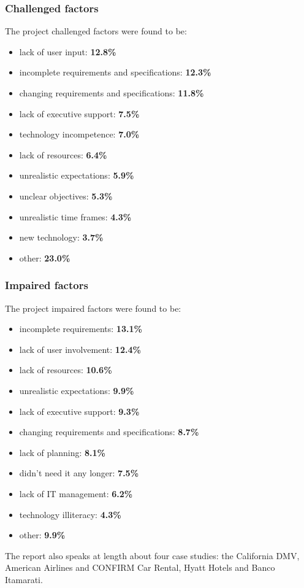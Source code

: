\documentclass[journal]{IEEEtran}
\begin{document}
\subsubsection{Challenged factors}
The project challenged factors were found to be:
\begin{itemize}
	\item lack of user input: \textbf{12.8\%}
	\item incomplete requirements and specifications: \textbf{12.3\%}
	\item changing requirements and specifications: \textbf{11.8\%}
	\item lack of executive support: \textbf{7.5\%}
	\item technology incompetence: \textbf{7.0\%}
	\item lack of resources: \textbf{6.4\%}
	\item unrealistic expectations: \textbf{5.9\%}
	\item unclear objectives: \textbf{5.3\%}
	\item unrealistic time frames: \textbf{4.3\%}
	\item new technology: \textbf{3.7\%}
	\item other: \textbf{23.0\%}
\end{itemize}
\subsubsection{Impaired factors}
The project impaired factors were found to be:
\begin{itemize}
	\item incomplete requirements: \textbf{13.1\%}
	\item lack of user involvement: \textbf{12.4\%}
	\item lack of resources: \textbf{10.6\%}
	\item unrealistic expectations: \textbf{9.9\%}
	\item lack of executive support: \textbf{9.3\%}
	\item changing requirements and specifications: \textbf{8.7\%}
	\item lack of planning: \textbf{8.1\%}
	\item didn't need it any longer: \textbf{7.5\%}
	\item lack of IT management: \textbf{6.2\%}
	\item technology illiteracy: \textbf{4.3\%}
	\item other: \textbf{9.9\%}
\end{itemize}
The report also speaks at length about four case studies: the California DMV, American Airlines and CONFIRM Car Rental, Hyatt Hotels and Banco Itamarati.
\end{document}
